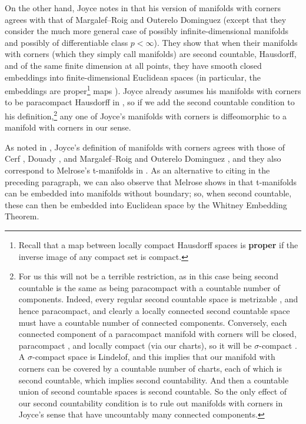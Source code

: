 On the other hand, Joyce notes in \cite[Remark 2.11 (see also Remark 6.3)]{Joy12} that his version of manifolds with corners agrees with that of Margalef--Roig and Outerelo Dominguez \cite{MaDo92} (except that they consider the much more general case of possibly infinite-dimensional manifolds and possibly of differentiable class $p<\infty$).
They show that when their manifolds with corners (which they simply call manifolds) are second countable, Hausdorff, and of the same finite dimension at all points, they have smooth closed embeddings into finite-dimensional Euclidean spaces \cite[Corollary 11.3.10]{MaDo92} (in particular, the embeddings are proper\footnote{Recall that a map between locally compact Hausdorff spaces is \textbf{proper} if the inverse image of any compact set is compact.} maps \cite[Proposition 3.3.4]{MaDo92}).
Joyce already assumes his manifolds with corners to be paracompact Hausdorff in \cite[Definition 2.1]{Joy12}, so if we add the second countable condition to his definition,\footnote{\label{F: countable}For us this will not be a terrible restriction, as in this case being second countable is the same as being paracompact with a countable number of components.
Indeed, every regular second countable space is metrizable \cite[Theorem 34.1]{Mu00}, and hence paracompact, and clearly a locally connected second countable space must have a countable number of connected components.
Conversely, each connected component of a paracompact manifold with corners will be closed, paracompact \cite[Theorem 41.2]{Mu00}, and locally compact (via our charts), so it will be $\sigma$-compact \cite[Appendix A.1]{Sp79}.
A $\sigma$-compact space is Lindelof, and this implies that our manifold with corners can be covered by a countable number of charts, each of which is second countable, which implies second countability.
And then a countable union of second countable spaces is second countable.
So the only effect of our second countability condition is to rule out manifolds with corners in Joyce's sense that have uncountably many connected components.}
any one of Joyce's manifolds with corners is diffeomorphic to a manifold with corners in our sense.

As noted in \cite[Remark 2.11]{Joy12}, Joyce's definition of manifolds with corners agrees with those of Cerf \cite{Ce61}, Douady \cite{Doua61}, and Margalef--Roig and Outerelo Dominguez \cite{MaDo92}, and they also correspond to Melrose's t-manifolds in \cite{Melrose}.
As an alternative to citing \cite{MaDo92} in the preceding paragraph, we can also observe that Melrose shows in \cite[Proposition 1.14.1]{Melrose} that t-manifolds can be embedded into manifolds without boundary; so, when second countable, these can then be embedded into Euclidean space by the Whitney Embedding Theorem.

